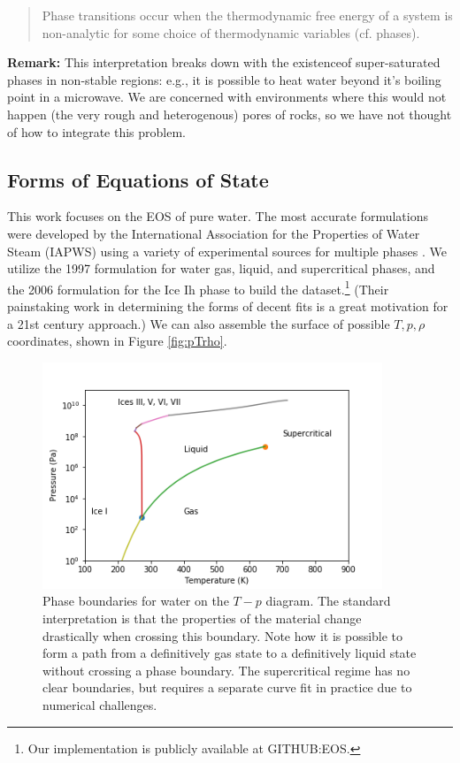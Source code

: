 \documentclass[AMA,STIX1COL]{WileyNJD-v2}
\begin{document}
\begin{quote}
Phase transitions occur when the thermodynamic free energy of a system
is non-analytic for some choice of thermodynamic variables (cf. phases).
\end{quote}


{\bf Remark:} This interpretation breaks down with the existenceof super-saturated phases in non-stable regions: e.g., it is possible to
heat water beyond it's boiling point in a microwave. We are concerned
with environments where this would not happen (the very rough and
heterogenous) pores of rocks, so we have not thought of how to
integrate this problem.

\subsection{Forms of Equations of State}

This work focuses on the EOS of pure water. The most accurate
formulations were developed by the International Association for the
Properties of Water Steam (IAPWS) using a variety of experimental
sources for multiple phases \cite{wagner_iapws_2000,
  water_revised_2007, water_revised_2009}. We utilize the 1997
formulation for water gas, liquid, and supercritical phases, and the
2006 formulation for the Ice Ih phase to build the dataset.\footnote{Our
implementation is publicly available at GITHUB:EOS.} (Their
painstaking work in determining the forms of decent fits is a great
motivation for a 21st century approach.)
We can also assemble the surface of possible $T,p,\rho$ coordinates,
shown in Figure \ref{fig:pTrho}.
\begin{figure}
\centering
\includegraphics[width=4in]{../figures/phase_diagram.png}
\caption{\label{fig:phaseboundaries}Phase boundaries for water on the $T-p$ diagram. The standard
interpretation is that the properties of the material change
drastically when crossing this boundary. Note how it is possible to form a path from a
definitively gas state to a definitively liquid state without crossing
a phase boundary. The supercritical regime has no clear boundaries,
but requires a separate curve fit in practice due to numerical challenges.}
\end{figure}
\end{document}

